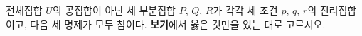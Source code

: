 전체집합 $U$의 공집합이 아닌 세 부분집합 $P$, $Q$, $R$가 각각 세 조건 $p$, $q$, $r$의 진리집합이고, 다음 세 명제가 모두 참이다. \noindent \textbf{보기}에서 옳은 것만을 있는 대로 고르시오. 

